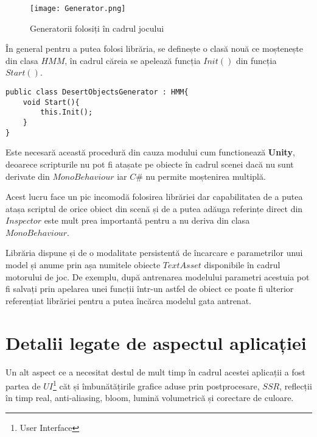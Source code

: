 \vspace{10mm}
\begin{figure}[H]
\centering
\texttt{[image: Generator.png]} \par
\caption{Generatorii folosiți în cadrul jocului}
\end{figure}

În general pentru a putea folosi librăria, se definește o clasă nouă ce moștenește din clasa $HMM$, în cadrul căreia se apelează funcția $Init()$ din funcția $Start()$.\par

\begin{lstlisting}[caption=Exemplu de folosire a librăriei]
public class DesertObjectsGenerator : HMM{
    void Start(){
        this.Init();
    }
}
\end{lstlisting}

Este necesară această procedură din cauza modului cum functionează \textbf{Unity}, deoarece scripturile nu pot fi atașate pe obiecte în cadrul scenei dacă nu sunt derivate din $MonoBehaviour$ iar $C\#$ nu permite moștenirea multiplă.\par

Acest lucru face un pic incomodă folosirea librăriei dar capabilitatea de a putea atașa scriptul de orice obiect din scenă și de a putea adăuga referințe direct din $Inspector$ este mult prea importantă pentru a nu deriva din clasa $MonoBehaviour$.\par

Librăria dispune și de o modalitate persistentă de încarcare e parametrilor unui model și anume prin așa numitele obiecte $TextAsset$ disponibile în cadrul motorului de joc. De exemplu, după antrenarea modelului parametri acestuia pot fi salvați prin apelarea unei funcții într-un astfel de obiect ce poate fi ulterior referențiat librăriei pentru a putea încărca modelul gata antrenat.\par

\section{Detalii legate de aspectul aplicației}

Un alt aspect ce a necesitat destul de mult timp în cadrul acestei aplicații a fost partea de $UI$\footnote{User Interface} căt și îmbunătățirile grafice aduse prin postprocesare, $SSR$, reflecții în timp real, anti-aliasing, bloom, lumină volumetrică și corectare de culoare.\par

